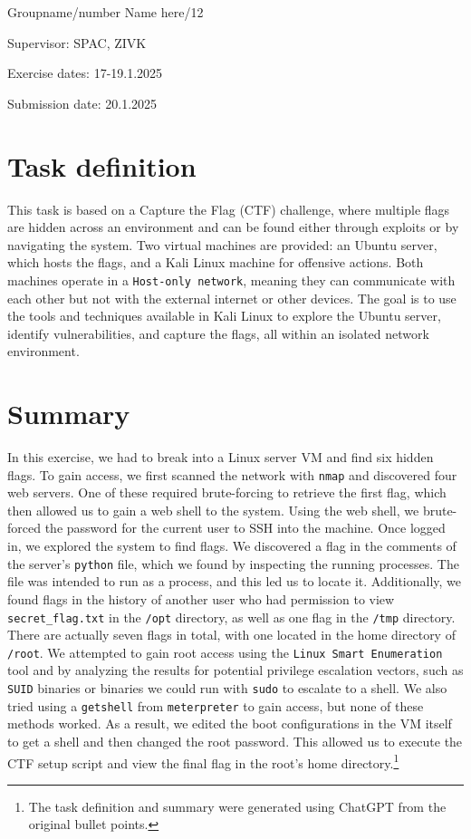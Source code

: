 \documentclass[a4paper]{article}
\newcommand{\abc}{\hfill \break}
\begin{document}
Groupname/number Name here/12

Supervisor: 	SPAC, ZIVK

Exercise dates: 17-19.1.2025

Submission date: 20.1.2025


\newpage
\tableofcontents

\newpage

\section{Task definition}

This task is based on a Capture the Flag (CTF) challenge, where multiple flags are hidden across an environment and can be found either through exploits or by navigating the system. Two virtual machines are provided: an Ubuntu server, which hosts the flags, and a Kali Linux machine for offensive actions. Both machines operate in a \texttt{Host-only network}, meaning they can communicate with each other but not with the external internet or other devices.\abc
The goal is to use the tools and techniques available in Kali Linux to explore the Ubuntu server, identify vulnerabilities, and capture the flags, all within an isolated network environment.


\section{Summary}
In this exercise, we had to break into a Linux server VM and find six hidden flags. To gain access, we first scanned the network with \texttt{nmap} and discovered four web servers. One of these required brute-forcing to retrieve the first flag, which then allowed us to gain a web shell to the system. Using the web shell, we brute-forced the password for the current user to SSH into the machine. Once logged in, we explored the system to find flags.\abc
We discovered a flag in the comments of the server's \texttt{python} file, which we found by inspecting the running processes. The file was intended to run as a process, and this led us to locate it. Additionally, we found flags in the history of another user who had permission to view \texttt{secret\_flag.txt} in the \texttt{/opt} directory, as well as one flag in the \texttt{/tmp} directory. There are actually seven flags in total, with one located in the home directory of \texttt{/root}.\abc
We attempted to gain root access using the \texttt{Linux Smart Enumeration} tool and by analyzing the results for potential privilege escalation vectors, such as \texttt{SUID} binaries or binaries we could run with \texttt{sudo} to escalate to a shell. We also tried using a \texttt{getshell} from \texttt{meterpreter} to gain access, but none of these methods worked. As a result, we edited the boot configurations in the VM itself to get a shell and then changed the root password. This allowed us to execute the CTF setup script and view the final flag in the root's home directory.\footnote{The task definition and summary were generated using ChatGPT from the original bullet points.}
\newpage
\end{document}
